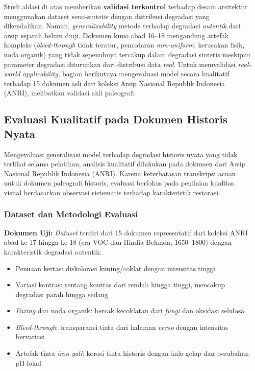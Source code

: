 \documentclass[12pt,a4paper]{article}
\begin{document}
\noindent
Studi ablasi di atas memberikan \textbf{validasi terkontrol} terhadap desain arsitektur menggunakan dataset semi-sintetis dengan distribusi degradasi yang dikendalikan. Namun, \textit{generalizability} metode terhadap degradasi \textit{autentik} dari arsip sejarah belum diuji. Dokumen kuno abad 16--18 mengandung artefak kompleks (\textit{bleed-through} tidak teratur, pemudaran \textit{non-uniform}, kerusakan fisik, noda organik) yang tidak sepenuhnya tercakup dalam degradasi sintetis meskipun parameter degradasi diturunkan dari distribusi data \textit{real}. Untuk memvalidasi \textit{real-world applicability}, bagian berikutnya mengevaluasi model secara kualitatif terhadap 15 dokumen asli dari koleksi Arsip Nasional Republik Indonesia (ANRI), melibatkan validasi ahli paleografi.

\vspace{0.8em}

\subsection{Evaluasi Kualitatif pada Dokumen Historis Nyata}
\label{subsec:evaluasi-kualitatif-anri}
\vspace{0.8em}

Mengevaluasi generalisasi model terhadap degradasi historis nyata yang tidak terlihat selama pelatihan, analisis kualitatif dilakukan pada dokumen dari Arsip Nasional Republik Indonesia (ANRI). Karena keterbatasan transkripsi acuan untuk dokumen paleografi historis, evaluasi berfokus pada penilaian kualitas visual berdasarkan observasi sistematis terhadap karakteristik restorasi.
\vspace{0.8em}

\subsubsection{Dataset dan Metodologi Evaluasi}
\label{subsubsec:anri-dataset-metodologi}

\textbf{Dokumen Uji:} \textit{Dataset} terdiri dari 15 dokumen representatif dari koleksi ANRI abad ke-17 hingga ke-18 (era VOC dan Hindia Belanda, 1650--1800) dengan karakteristik degradasi autentik:
\begin{itemize}[nosep]
    \item Penuaan kertas: diskolorasi kuning/coklat dengan intensitas tinggi
    \item Variasi kontras: rentang kontras dari rendah hingga tinggi, mencakup degradasi parah hingga sedang
    \item \textit{Foxing} dan noda organik: bercak kecoklatan dari \textit{fungi} dan oksidasi selulosa
    \item \textit{Bleed-through}: transparansi tinta dari halaman \textit{verso} dengan intensitas bervariasi
    \item Artefak tinta \textit{iron gall}: korosi tinta historis dengan halo gelap dan perubahan pH lokal
\end{itemize}
\end{document}
